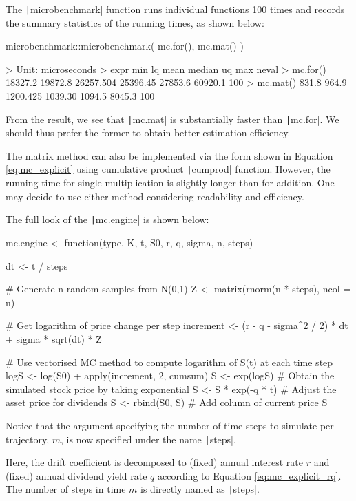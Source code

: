 The \texttt|microbenchmark| function runs individual functions 100 times and records the summary statistics of the running times, as shown below:

\begin{Rminted}
microbenchmark::microbenchmark(
    mc.for(),
    mc.mat()
)

>     Unit: microseconds
>     expr     min      lq      mean   median      uq     max neval
> mc.for() 18327.2 19872.8 26257.504 25396.45 27853.6 60920.1   100
> mc.mat()   831.8   964.9  1200.425  1039.30  1094.5  8045.3   100
\end{Rminted}

From the result, we see that \texttt|mc.mat| is substantially faster than \texttt|mc.for|. We should thus prefer the former to obtain better estimation efficiency.

The matrix method can also be implemented via the form shown in Equation \ref{eq:mc_explicit} using cumulative product \texttt|cumprod| function. However, the running time for single multiplication is slightly longer than for addition. One may decide to use either method considering readability and efficiency.

The full look of the \texttt|mc.engine| is shown below:

\begin{Rminted}
mc.engine <- function(type, K, t, S0, r, q, sigma, n, steps) {

    dt <- t / steps

    # Generate n random samples from N(0,1)
    Z <- matrix(rnorm(n * steps), ncol = n)

    # Get logarithm of price change per step
    increment <- (r - q - sigma^2 / 2) * dt + sigma * sqrt(dt) * Z

    # Use vectorised MC method to compute logarithm of S(t) at each time step
    logS <- log(S0) + apply(increment, 2, cumsum)
    S <- exp(logS) # Obtain the simulated stock price by taking exponential
    S <- S * exp(-q * t) # Adjust the asset price for dividends
    S <- rbind(S0, S) # Add column of current price
    S
}
\end{Rminted}

Notice that the argument specifying the number of time steps to simulate per trajectory, $m$, is now specified under the name \texttt|steps|.

Here, the drift coefficient is decomposed to (fixed) annual interest rate $r$ and (fixed) annual dividend yield rate $q$ according to Equation \ref{eq:mc_explicit_rq}. The number of steps in time $m$ is directly named as \texttt|steps|.

